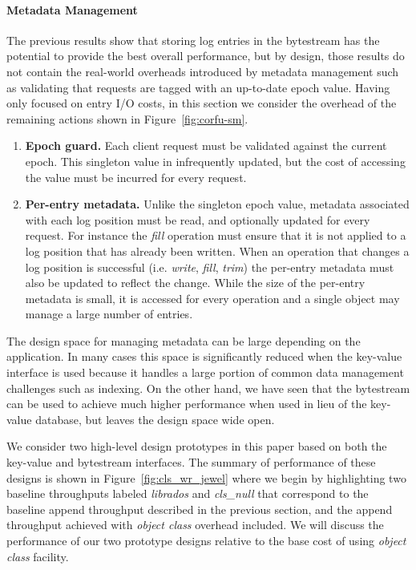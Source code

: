 \documentclass[10pt,twocolumn]{article}
\begin{document}
\paragraph*{Metadata Management}

The previous results show that storing log entries in the bytestream has the
potential to provide the best overall performance, but by design, those
results do not contain the real-world overheads introduced by metadata
management such as validating that requests are tagged with an up-to-date
epoch value. Having only focused on entry I/O costs, in this section we
consider the overhead of the remaining actions shown in
Figure~\ref{fig:corfu-sm}.

\begin{enumerate}
    \item {\bf Epoch guard.} Each client request must be validated against the
        current epoch. This singleton value in infrequently updated, but the
        cost of accessing the value must be incurred for every request.

    \item {\bf Per-entry metadata.} Unlike the singleton epoch value, metadata
        associated with each log position must be read, and optionally updated
        for every request. For instance the \emph{fill} operation must ensure
        that it is not applied to a log position that has already been
        written. When an operation that changes a log position is successful
        (i.e. \emph{write}, \emph{fill}, \emph{trim}) the per-entry metadata
        must also be updated to reflect the change. While the size of the
        per-entry metadata is small, it is accessed for every operation and a
        single object may manage a large number of entries.
\end{enumerate}

The design space for managing metadata can be large depending on the
application. In many cases this space is significantly reduced when the
key-value interface is used because it handles a large portion of common data
management challenges such as indexing. On the other hand, we have seen that
the bytestream can be used to achieve much higher performance when used in
lieu of the key-value database, but leaves the design space wide open.

We consider two high-level design prototypes in this paper based on both the
key-value and bytestream interfaces. The summary of performance of these
designs is shown in Figure~\ref{fig:cls_wr_jewel} where we begin by
highlighting two baseline throughputs labeled \emph{librados} and
\emph{cls\_null} that correspond to the baseline append throughput described
in the previous section, and the append throughput achieved with \emph{object
class} overhead included. We will discuss the performance of our two prototype
designs relative to the base cost of using \emph{object class} facility.
\end{document}
